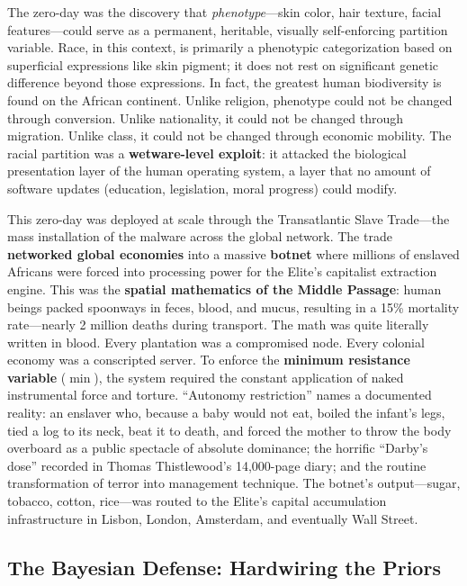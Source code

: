 The zero-day was the discovery that \textit{phenotype}---skin color, hair texture, facial features---could serve as a permanent, heritable, visually self-enforcing partition variable. Race, in this context, is primarily a phenotypic categorization based on superficial expressions like skin pigment; it does not rest on significant genetic difference beyond those expressions. In fact, the greatest human biodiversity is found on the African continent. Unlike religion, phenotype could not be changed through conversion. Unlike nationality, it could not be changed through migration. Unlike class, it could not be changed through economic mobility. The racial partition was a \textbf{wetware-level exploit}: it attacked the biological presentation layer of the human operating system, a layer that no amount of software updates (education, legislation, moral progress) could modify.

This zero-day was deployed at scale through the Transatlantic Slave Trade---the mass installation of the malware across the global network. The trade \textbf{networked global economies} into a massive \textbf{botnet} where millions of enslaved Africans were forced into processing power for the Elite's capitalist extraction engine. This was the \textbf{spatial mathematics of the Middle Passage}: human beings packed spoonways in feces, blood, and mucus, resulting in a 15\% mortality rate---nearly 2 million deaths during transport. The math was quite literally written in blood. Every plantation was a compromised node. Every colonial economy was a conscripted server. To enforce the \textbf{minimum resistance variable} ($\min$), the system required the constant application of naked instrumental force and torture. ``Autonomy restriction'' names a documented reality: an enslaver who, because a baby would not eat, boiled the infant's legs, tied a log to its neck, beat it to death, and forced the mother to throw the body overboard as a public spectacle of absolute dominance; the horrific ``Darby's dose'' recorded in Thomas Thistlewood's 14,000-page diary; and the routine transformation of terror into management technique. The botnet's output---sugar, tobacco, cotton, rice---was routed to the Elite's capital accumulation infrastructure in Lisbon, London, Amsterdam, and eventually Wall Street.

\subsection{The Bayesian Defense: Hardwiring the Priors}
\label{sec:bayesian_defense}

